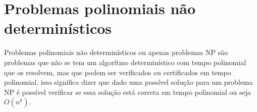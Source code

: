 \section{Problemas polinomiais não determinísticos}
Problemas polinomiais não determinísticos ou apenas problemas NP são problemas que não se tem um algorítmo determinístico com tempo polinomial que os resolvem, mas que podem ser verificados ou certificados em tempo polinomial, isso significa dizer que dado uma possível solução para um problema NP é possível verificar se essa solução está correta em tempo polinomial ou seja $O(n^k)$.

